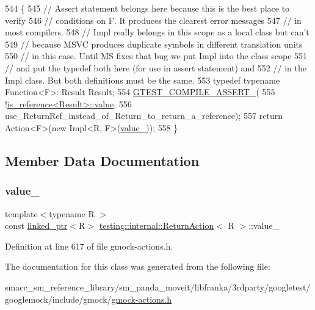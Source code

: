 \begin{DoxyCode}
544                              \{
545     \textcolor{comment}{// Assert statement belongs here because this is the best place to verify}
546     \textcolor{comment}{// conditions on F. It produces the clearest error messages}
547     \textcolor{comment}{// in most compilers.}
548     \textcolor{comment}{// Impl really belongs in this scope as a local class but can't}
549     \textcolor{comment}{// because MSVC produces duplicate symbols in different translation units}
550     \textcolor{comment}{// in this case. Until MS fixes that bug we put Impl into the class scope}
551     \textcolor{comment}{// and put the typedef both here (for use in assert statement) and}
552     \textcolor{comment}{// in the Impl class. But both definitions must be the same.}
553     \textcolor{keyword}{typedef} \textcolor{keyword}{typename} Function<F>::Result Result;
554     \hyperlink{gtest-port_8h_ae1f37dc71d5daa6fb49ca1b6047d4a8c}{GTEST\_COMPILE\_ASSERT\_}(
555         !\hyperlink{structtesting_1_1internal_1_1bool__constant_a499fba6576296b04d99690a486424b32}{is\_reference<Result>::value},
556         use\_ReturnRef\_instead\_of\_Return\_to\_return\_a\_reference);
557     \textcolor{keywordflow}{return} Action<F>(\textcolor{keyword}{new} Impl<R, F>(\hyperlink{classtesting_1_1internal_1_1ReturnAction_a321f509b255d1651234f53e8b064d98d}{value\_}));
558   \}
\end{DoxyCode}


\subsection{Member Data Documentation}
\mbox{\label{classtesting_1_1internal_1_1ReturnAction_a321f509b255d1651234f53e8b064d98d}} 
\subsubsection{\texorpdfstring{value\+\_\+}{value\_}}
{\footnotesize\ttfamily template$<$typename R $>$ \\
const \hyperlink{classtesting_1_1internal_1_1linked__ptr}{linked\+\_\+ptr}$<$R$>$ \hyperlink{classtesting_1_1internal_1_1ReturnAction}{testing\+::internal\+::\+Return\+Action}$<$ R $>$\+::value\+\_\+\hspace{0.3cm}{\ttfamily [private]}}



Definition at line 617 of file gmock-\/actions.\+h.



The documentation for this class was generated from the following file\+:\begin{DoxyCompactItemize}
\item 
smacc\+\_\+sm\+\_\+reference\+\_\+library/sm\+\_\+panda\+\_\+moveit/libfranka/3rdparty/googletest/googlemock/include/gmock/\hyperlink{gmock-actions_8h}{gmock-\/actions.\+h}\end{DoxyCompactItemize}
